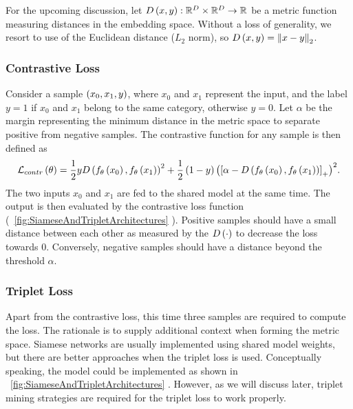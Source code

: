 For the upcoming discussion, let ${D} \left( x, y \right): \mathbb{R}^D \times \mathbb{R}^D \to \mathbb{R}$ be a metric function measuring distances in the embedding space. Without a loss of generality, we resort to use of the Euclidean distance ($L_2$ norm), so ${D} \left( x, y \right) = {\left\Vert {x - y} \right\Vert}_2$.

\subsubsection{Contrastive Loss}

Consider a sample $\left( {x_0, x_1, y} \right)$, where $x_0$ and $x_1$ represent the input, and the label $y = 1$ if $x_0$ and $x_1$ belong to the same category, otherwise $y = 0$. Let $\alpha$ be the margin representing the minimum distance in the metric space to separate positive from negative samples. The contrastive function for any sample is then defined as~\cite{hadsell2006dimreduction}
\begin{equation}
    \label{eq:ContrastiveLoss}
    {\mathcal{L}_{contr}} \left( \theta \right) =
    \frac{1}{2}y
    {{D} \left( {f_\theta} \left( x_0 \right), {f_\theta} \left( x_1 \right) \right)}^2 +
    \frac{1}{2}
    \left( {1 - y} \right) {\left( {
            \left[ {\alpha - {D} \left( {f_\theta} \left( x_0 \right), {f_\theta} \left( x_1 \right) \right)} \right]_{+}} \right)}^2.
\end{equation}
The two inputs $x_0$ and $x_1$ are fed to the shared model at the same time. The output is then evaluated by the contrastive loss function (\figtext{}~\ref{fig:SiameseAndTripletArchitectures} ). Positive samples should have a small distance between each other as measured by the ${D} \left( \cdot \right)$ to decrease the loss towards $0$. Conversely, negative samples should have a distance beyond the threshold $\alpha$.

\subsubsection{Triplet Loss}

Apart from the contrastive loss, this time three samples are required to compute the loss. The rationale is to supply additional context when forming the metric space. Siamese networks are usually implemented using shared model weights, but there are better approaches when the triplet loss is used. Conceptually speaking, the model could be implemented as shown in \figtext{}~\ref{fig:SiameseAndTripletArchitectures} . However, as we will discuss later, triplet mining strategies are required for the triplet loss to work properly.

